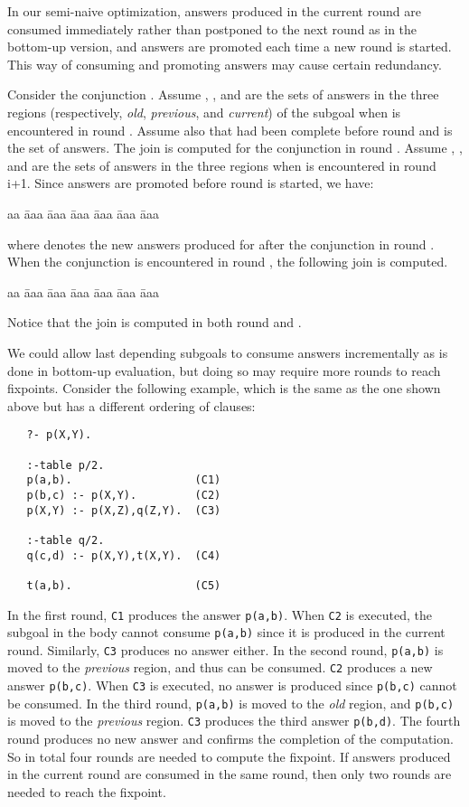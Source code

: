 \documentclass{tlp}
\begin{document}
In our semi-naive optimization, answers produced in the current round are consumed immediately rather than postponed to the next round as in the bottom-up version, and answers are promoted each time a new round is started. This way of consuming and promoting answers may cause certain redundancy. 

Consider the conjunction . Assume , , and  are the sets of answers in the three regions (respectively, {\it old}, {\it previous}, and {\it current}) of the subgoal  when  is encountered in round . Assume also that  had been complete before round  and  is the set of answers. The join  is computed for the conjunction in round . Assume , , and  are the sets of answers in the three regions when  is encountered in round i+1. Since answers are promoted before round  is started, we have:
\begin{tabbing}
aa \= aaa \= aaa \= aaa \= aaa \= aaa \= aaa \kill
\>  \\
\>  
\end{tabbing}
where  denotes the new answers produced for  after the conjunction  in round . When the conjunction  is encountered in round , the following join is computed.
\begin{tabbing}
aa \= aaa \= aaa \= aaa \= aaa \= aaa \= aaa \kill
\> 
\end{tabbing}
Notice that the join  is computed in both round  and .

We could allow last depending subgoals to consume answers incrementally as is done in bottom-up evaluation, but doing so may require more rounds to reach fixpoints. Consider the following example, which is the same as the one shown above but has a different ordering of clauses:
\begin{verbatim}
   ?- p(X,Y).

   :-table p/2.
   p(a,b).                   (C1)
   p(b,c) :- p(X,Y).         (C2)
   p(X,Y) :- p(X,Z),q(Z,Y).  (C3)

   :-table q/2.
   q(c,d) :- p(X,Y),t(X,Y).  (C4)

   t(a,b).                   (C5)
\end{verbatim}
In the first round, {\tt C1} produces the answer {\tt p(a,b)}. When {\tt C2} is executed, the subgoal in the body cannot consume {\tt p(a,b)} since it is produced in the current round. Similarly, {\tt C3} produces no answer either. In the second round, {\tt p(a,b)} is moved to the {\it previous} region, and thus can be consumed. {\tt C2} produces a new answer {\tt p(b,c)}. When {\tt C3} is executed, no answer is produced since {\tt p(b,c)} cannot be consumed. In the third round, {\tt p(a,b)} is moved to the {\it old} region, and {\tt p(b,c)} is moved to the {\it previous} region. {\tt C3} produces the third answer {\tt p(b,d)}. The fourth round produces no new answer and confirms the completion of the computation. So in total four rounds are needed to compute the fixpoint. If answers produced in the current round are consumed in the same round, then only two rounds are needed to reach the fixpoint.
\end{document}

